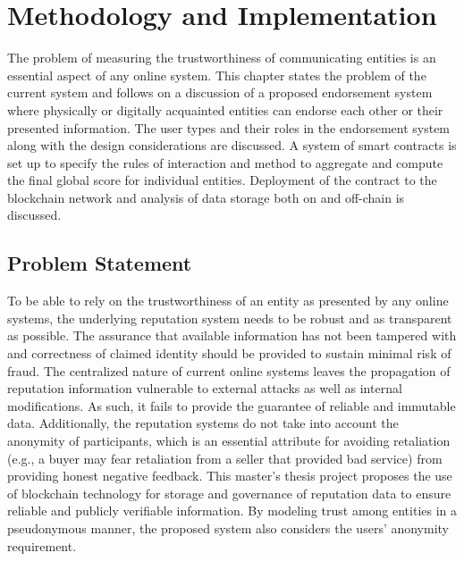 \chapter{Methodology and Implementation} \label{ch:method}
The problem of measuring the trustworthiness of communicating entities is an
essential aspect of any online system. This chapter states the problem of the
current system and follows on a discussion of a proposed endorsement system
where physically or digitally acquainted entities can endorse each other or
their presented information. The user types and their roles in the endorsement
system along with the design considerations are discussed. A system of smart
contracts is set up to specify the rules of interaction and method to aggregate
and compute the final global score for individual entities. Deployment of the
contract to the blockchain network and analysis of data storage both on and
off-chain is discussed. 

\section{Problem Statement}
To be able to rely on the trustworthiness of an entity as presented by any
online systems, the underlying reputation system needs to be robust and as
transparent as possible. The assurance that available information has not been
tampered with and correctness of claimed identity should be provided to sustain
minimal risk of fraud. The centralized nature of current online systems leaves
the propagation of reputation information vulnerable to external attacks as
well as internal modifications. As such, it fails to provide the guarantee of
reliable and immutable data. Additionally, the reputation systems do not take
into account the anonymity of participants, which is an essential attribute for
avoiding retaliation (e.g., a buyer may fear retaliation from a seller that
provided bad service) from providing honest negative feedback. This master's
thesis project proposes the use of blockchain technology for storage and
governance of reputation data to ensure reliable and publicly verifiable
information. By modeling trust among entities in a pseudonymous manner, the
proposed system also considers the users' anonymity requirement. 

